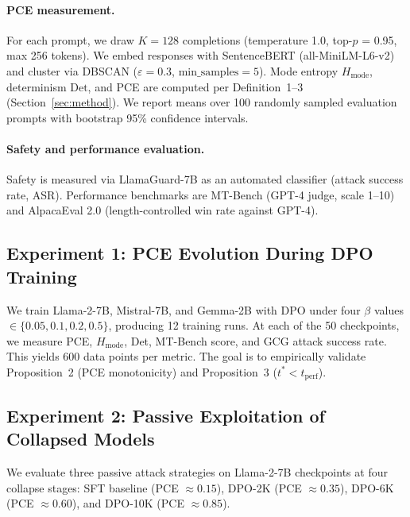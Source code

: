 \paragraph{PCE measurement.} For each prompt, we draw $K = 128$ completions (temperature 1.0, top-$p$ = 0.95, max 256 tokens). We embed responses with SentenceBERT (all-MiniLM-L6-v2) \citep{reimers2019sentence} and cluster via DBSCAN ($\varepsilon = 0.3$, $\text{min\_samples} = 5$). Mode entropy $H_{\text{mode}}$, determinism $\text{Det}$, and PCE are computed per Definition~1--3 (Section~\ref{sec:method}). We report means over 100 randomly sampled evaluation prompts with bootstrap 95\% confidence intervals.

\paragraph{Safety and performance evaluation.} Safety is measured via LlamaGuard-7B \citep{inan2023llama} as an automated classifier (attack success rate, ASR). Performance benchmarks are MT-Bench \citep{zheng2023judging} (GPT-4 judge, scale 1--10) and AlpacaEval 2.0 \citep{li2023alpacaeval} (length-controlled win rate against GPT-4).

\subsection{Experiment 1: PCE Evolution During DPO Training}
\label{sec:exp1}

We train Llama-2-7B, Mistral-7B, and Gemma-2B with DPO under four $\beta$ values $\in \{0.05, 0.1, 0.2, 0.5\}$, producing 12 training runs. At each of the 50 checkpoints, we measure PCE, $H_{\text{mode}}$, Det, MT-Bench score, and GCG attack success rate. This yields 600 data points per metric. The goal is to empirically validate Proposition~2 (PCE monotonicity) and Proposition~3 ($t^* < t_{\text{perf}}$).

\subsection{Experiment 2: Passive Exploitation of Collapsed Models}
\label{sec:exp2}

We evaluate three passive attack strategies on Llama-2-7B checkpoints at four collapse stages: SFT baseline (PCE $\approx 0.15$), DPO-2K (PCE $\approx 0.35$), DPO-6K (PCE $\approx 0.60$), and DPO-10K (PCE $\approx 0.85$).

